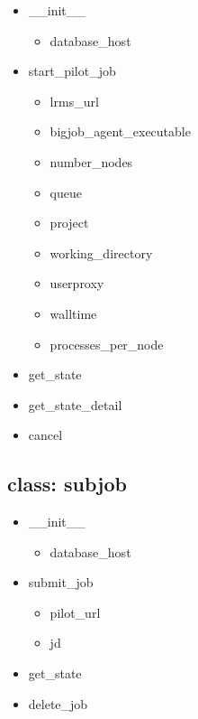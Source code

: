 \documentclass[]{article}
\begin{document}
\begin{itemize}
	\item \_\_init\_\_
		\begin{itemize}
			\item database\_host
		\end{itemize}
	\item start\_pilot\_job
	\begin{itemize}
		\item lrms\_url
		\item bigjob\_agent\_executable
		\item number\_nodes
		\item queue
		\item project
		\item working\_directory
		\item userproxy
		\item walltime
		\item processes\_per\_node
	\end{itemize}
	\item get\_state	
	\item get\_state\_detail
	\item cancel
\end{itemize}

\subsection{class: subjob}
\begin{itemize}
\item \_\_init\_\_
		\begin{itemize}
			\item database\_host
		\end{itemize}
	\item submit\_job
	\begin{itemize}
		\item pilot\_url
		\item jd
	\end{itemize}

	\item get\_state

	\item delete\_job
\end{itemize}



\end{document}
